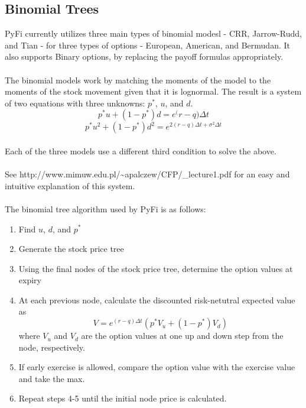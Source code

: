 \documentclass[10pt]{article}
\begin{document}
\subsection{Binomial Trees}
PyFi currently utilizes three main types of binomial modesl - CRR, Jarrow-Rudd, and Tian - for three
types of options - European, American, and Bermudan. It also supports Binary options, by replacing the
payoff formulas appropriately.\\
\\
The binomial models work by matching the moments of the model to the moments of the stock movement given that
it is lognormal. The result is a system of two equations with three unknowns: $p^{*}$, $u$, and $d$.\\
    \begin{equation}
        p^{*}u+(1-p^{*})d = e^({r-q)\Delta t}
    \end{equation}
    \begin{equation}
        p^{*}u^2 + (1-p^{*})d^2 = e^{2(r-q)\Delta t+\sigma^2\Delta t}
    \end{equation}
\\
Each of the three models use a different third condition to solve the above.\\
\\
See http://www.mimuw.edu.pl/\~{}apalczew/CFP/\_lecture1.pdf for an easy and intuitive explanation of this system.\\
\\
The binomial tree algorithm used by PyFi is as follows:
\begin{enumerate}
    \item Find $u$, $d$, and $p^{*}$
    \item Generate the stock price tree
    \item Using the final nodes of the stock price tree, determine the option values at expiry
    \item At each previous node, calculate the discounted risk-netutral expected value as
        \begin{equation}
            V = e^{(r-q)\Delta t}(p^{*}V_{u} + (1-p^{*})V_{d})
        \end{equation}
        where $V_{u}$ and $V_{d}$ are the option values at one up and down step from the node, respectively.
    \item If early exercise is allowed, compare the option value with the exercise value and take the max.
    \item Repeat steps 4-5 until the initial node price is calculated.
\end{enumerate}
\end{document}
